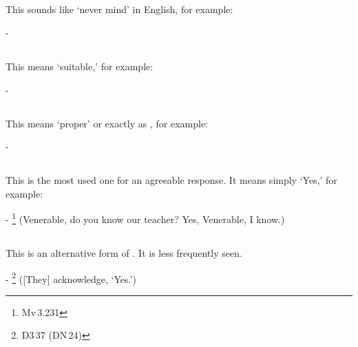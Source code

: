 \subsection*{}\label{nip:lahu}
This sounds like `never mind' in English, for example:\par
-  \par

\subsection*{}\label{nip:opaayikadm}
This means `suitable,' for example:\par
-  \par

\subsection*{}\label{nip:patiruupadm}
This means `proper' or exactly as , for example:\par
-  \par

\subsection*{}\label{nip:aama}
This is the most used one for an agreeable response. It means simply `Yes,' for example:\par
- \footnote{Mv\,3.231} (Venerable, do you know our teacher? Yes, Venerable, I know.) \par

\subsection*{}\label{nip:aamo}
This is an alternative form of . It is less frequently seen.\par
- \footnote{D3\,37 (DN\,24)} ([They] acknowledge, `Yes.') \par

